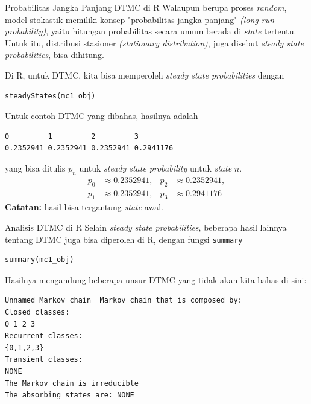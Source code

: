 \documentclass{beamer}
\begin{document}
\begin{frame}[fragile]{Probabilitas Jangka Panjang DTMC di R}
    Walaupun berupa proses \textit{random}, model stokastik memiliki konsep "probabilitas jangka panjang" \textit{(long-run probability)}, yaitu hitungan probabilitas secara umum berada di \textit{state} tertentu. Untuk itu, distribusi stasioner \textit{(stationary distribution)}, juga disebut \textit{steady state probabilities}, bisa dihitung.

    Di R, untuk DTMC, kita bisa memperoleh \textit{steady state probabilities} dengan

\begin{verbatim}
steadyStates(mc1_obj)
\end{verbatim}

    Untuk contoh DTMC yang dibahas, hasilnya adalah

\begin{verbatim}
0         1         2         3
0.2352941 0.2352941 0.2352941 0.2941176
\end{verbatim}
    yang bisa ditulis \(p_n\) untuk \textit{steady state probability} untuk \textit{state} \(n\).
    \begin{align*}
        p_0 &\approx 0.2352941, & p_2 &\approx 0.2352941, \\
        p_1 &\approx 0.2352941, & p_3 &\approx 0.2941176
    \end{align*}
    \textbf{Catatan:} hasil bisa tergantung \textit{state} awal.
\end{frame}

\begin{frame}[fragile]{Analisis DTMC di R}
    Selain \textit{steady state probabilities}, beberapa hasil lainnya tentang DTMC juga bisa diperoleh di R, dengan fungsi \verb|summary|

\begin{verbatim}
summary(mc1_obj)    
\end{verbatim}

    Hasilnya mengandung beberapa unsur DTMC yang tidak akan kita bahas di sini:

\begin{verbatim}
Unnamed Markov chain  Markov chain that is composed by: 
Closed classes: 
0 1 2 3 
Recurrent classes: 
{0,1,2,3}
Transient classes: 
NONE 
The Markov chain is irreducible 
The absorbing states are: NONE
\end{verbatim}
\end{frame}
\end{document}
